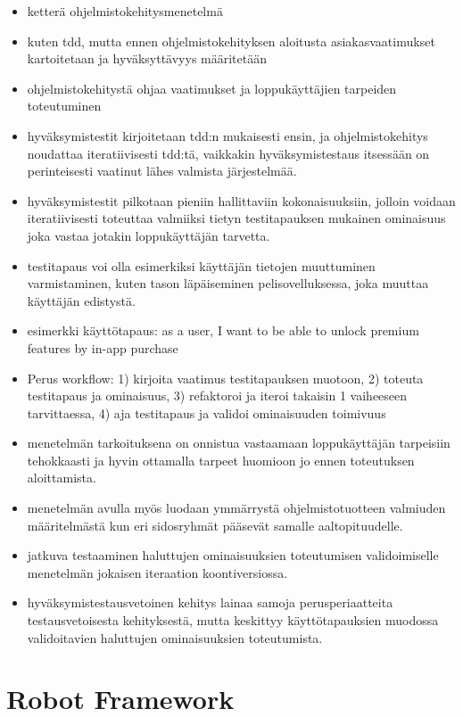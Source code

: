 
  \begin{itemize}
    \item ketterä ohjelmistokehitysmenetelmä
    \item kuten tdd, mutta ennen ohjelmistokehityksen aloitusta asiakasvaatimukset kartoitetaan ja hyväksyttävyys määritetään
    \item ohjelmistokehitystä ohjaa vaatimukset ja loppukäyttäjien tarpeiden toteutuminen
    \item hyväksymistestit kirjoitetaan tdd:n mukaisesti ensin, ja ohjelmistokehitys noudattaa iteratiivisesti tdd:tä, vaikkakin hyväksymistestaus itsessään on perinteisesti vaatinut lähes valmista järjestelmää.
    \item hyväksymistestit pilkotaan pieniin hallittaviin kokonaisuuksiin, jolloin voidaan iteratiivisesti toteuttaa valmiiksi tietyn testitapauksen mukainen ominaisuus joka vastaa jotakin loppukäyttäjän tarvetta.
    \item testitapaus voi olla esimerkiksi käyttäjän tietojen muuttuminen varmistaminen, kuten tason läpäiseminen pelisovelluksessa, joka muuttaa käyttäjän edistystä.
    \item esimerkki käyttötapaus: as a user, I want to be able to unlock premium features by in-app purchase
    \item Perus workflow: 1) kirjoita vaatimus testitapauksen muotoon, 2) toteuta testitapaus ja ominaisuus, 3) refaktoroi ja iteroi takaisin 1 vaiheeseen tarvittaessa, 4) aja testitapaus ja validoi ominaisuuden toimivuus
    \item menetelmän tarkoituksena on onnistua vastaamaan loppukäyttäjän tarpeisiin tehokkaasti ja hyvin ottamalla tarpeet huomioon jo ennen toteutuksen aloittamista.
    \item menetelmän avulla myös luodaan ymmärrystä ohjelmistotuotteen valmiuden määritelmästä kun eri sidosryhmät pääsevät samalle aaltopituudelle.
    \item jatkuva testaaminen haluttujen ominaisuuksien toteutumisen validoimiselle menetelmän jokaisen iteraation koontiversiossa.
    \item hyväksymistestausvetoinen kehitys lainaa samoja perusperiaatteita testausvetoisesta kehityksestä, mutta keskittyy käyttötapauksien muodossa validoitavien haluttujen ominaisuuksien toteutumista.
  \end{itemize}

\section{Robot Framework} \label{ch:08_robot_framework}

